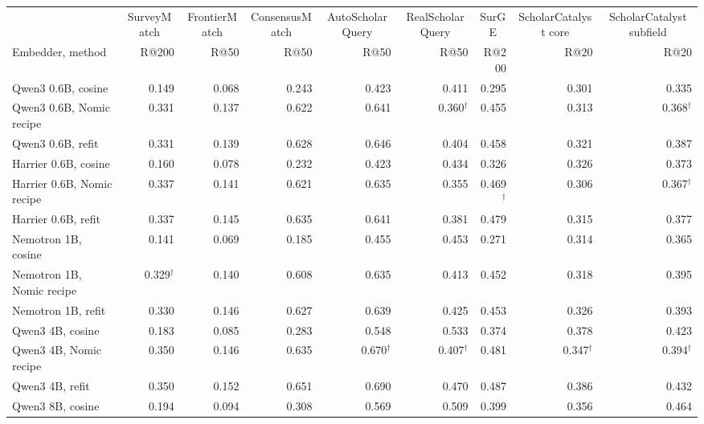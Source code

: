 \begin{table}[!htbp]
\centering
\scriptsize
\setlength{\tabcolsep}{4pt}
\begin{tabular}{lrrrrrrrr}
\toprule
 & \multicolumn{1}{c}{SurveyMatch} & \multicolumn{1}{c}{FrontierMatch} & \multicolumn{1}{c}{ConsensusMatch} & \multicolumn{1}{c}{AutoScholarQuery} & \multicolumn{1}{c}{RealScholarQuery} & \multicolumn{1}{c}{SurGE} & \multicolumn{1}{c}{ScholarCatalyst core} & \multicolumn{1}{c}{ScholarCatalyst subfield} \\
\cmidrule(lr){2-2}\cmidrule(lr){3-3}\cmidrule(lr){4-4}\cmidrule(lr){5-5}\cmidrule(lr){6-6}\cmidrule(lr){7-7}\cmidrule(lr){8-8}\cmidrule(lr){9-9}
Embedder, method & R@200 & R@50 & R@50 & R@50 & R@50 & R@200 & R@20 & R@20 \\
\midrule
Qwen3 0.6B, cosine & 0.149 & 0.068 & 0.243 & 0.423 & 0.411 & 0.295 & 0.301 & 0.335 \\
Qwen3 0.6B, Nomic recipe & 0.331 & 0.137 & 0.622 & 0.641 & 0.360$^\dagger$ & 0.455 & 0.313 & 0.368$^\dagger$ \\
Qwen3 0.6B, refit & 0.331 & 0.139 & 0.628 & 0.646 & 0.404 & 0.458 & 0.321 & 0.387 \\
\addlinespace
Harrier 0.6B, cosine & 0.160 & 0.078 & 0.232 & 0.423 & 0.434 & 0.326 & 0.326 & 0.373 \\
Harrier 0.6B, Nomic recipe & 0.337 & 0.141 & 0.621 & 0.635 & 0.355 & 0.469$^\dagger$ & 0.306 & 0.367$^\dagger$ \\
Harrier 0.6B, refit & 0.337 & 0.145 & 0.635 & 0.641 & 0.381 & 0.479 & 0.315 & 0.377 \\
\addlinespace
Nemotron 1B, cosine & 0.141 & 0.069 & 0.185 & 0.455 & 0.453 & 0.271 & 0.314 & 0.365 \\
Nemotron 1B, Nomic recipe & 0.329$^\dagger$ & 0.140 & 0.608 & 0.635 & 0.413 & 0.452 & 0.318 & 0.395 \\
Nemotron 1B, refit & 0.330 & 0.146 & 0.627 & 0.639 & 0.425 & 0.453 & 0.326 & 0.393 \\
\addlinespace
Qwen3 4B, cosine & 0.183 & 0.085 & 0.283 & 0.548 & 0.533 & 0.374 & 0.378 & 0.423 \\
Qwen3 4B, Nomic recipe & 0.350 & 0.146 & 0.635 & 0.670$^\dagger$ & 0.407$^\dagger$ & 0.481 & 0.347$^\dagger$ & 0.394$^\dagger$ \\
Qwen3 4B, refit & 0.350 & 0.152 & 0.651 & 0.690 & 0.470 & 0.487 & 0.386 & 0.432 \\
\addlinespace
Qwen3 8B, cosine & 0.194 & 0.094 & 0.308 & 0.569 & 0.509 & 0.399 & 0.356 & 0.464 \\

\end{tabular}
\end{table}
